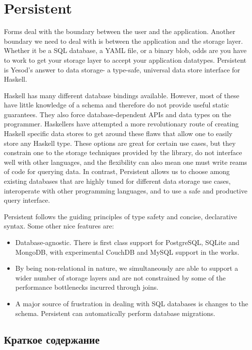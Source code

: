 \chapter{Persistent}\label{chap:persistent}

Forms deal with the boundary between the user and the application. Another boundary we need to deal with is between the application and the storage layer. Whether it be a SQL database, a YAML file, or a binary blob, odds are you have to work to get your storage layer to accept your application datatypes. Persistent is Yesod's answer to data storage- a type-safe, universal data store interface for Haskell.

Haskell has many different database bindings available. However, most of these have little knowledge of a schema and therefore do not provide useful static guarantees. They also force database-dependent APIs and data types on the programmer. Haskellers have attempted a more revolutionary route of creating Haskell specific data stores to get around these flaws that allow one to easily store any Haskell type. These options are great for certain use cases, but they constrain one to the storage techniques provided by the library, do not interface well with other languages, and the flexibility can also mean one must write reams of code for querying data. In contrast, Persistent allows us to choose among existing databases that are highly tuned for different data storage use cases, interoperate with other programming languages, and to use a safe and productive query interface.

Persistent follows the guiding principles of type safety and concise, declarative syntax. Some other nice features are:

\begin{itemize}
  \item Database-agnostic. There is first class support for PostgreSQL, SQLite and MongoDB, with experimental CouchDB and MySQL support in the works.
  \item By being non-relational in nature, we simultaneously are able to support a wider number of storage layers and are not constrained by some of the performance bottlenecks incurred through joins.
  \item A major source of frustration in dealing with SQL databases is changes to the schema. Persistent can automatically perform database migrations.
\end{itemize}

\section{Краткое содержание} %

